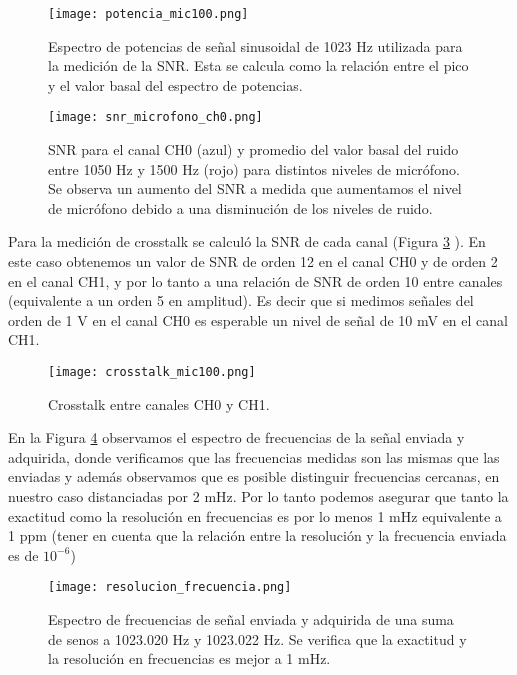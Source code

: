 \documentclass[a4paper, 11pt]{article}
\begin{document}
\begin{figure} [H]
\centering
\texttt{[image: potencia\_mic100.png]}
\caption{Espectro de potencias de señal sinusoidal de 1023 Hz utilizada para la medición de la SNR. Esta se calcula como la relación entre el pico y el valor basal del espectro de potencias. \label{fig:potencia_mic100}}
\end{figure} 

\begin{figure} [H]
\centering
\texttt{[image: snr\_microfono\_ch0.png]}
\caption{SNR para el canal CH0 (azul) y promedio del valor basal del ruido entre 1050 Hz y 1500 Hz (rojo) para distintos niveles de micrófono. Se observa un aumento del SNR a medida que aumentamos el nivel de micrófono debido a una disminución de los niveles de ruido. \label{fig:snr}}
\end{figure} 
Para la medición de crosstalk se calculó la SNR de cada canal %
(Figura \ref{fig:crosstalk_mic100} ). En este caso obtenemos un valor de SNR de orden 12 en el canal CH0 y de orden 2 en el canal CH1,  y por lo tanto a una relación de SNR de orden 10 entre canales (equivalente a un orden 5 en amplitud).  Es decir que si medimos señales del orden de 1 V en el canal CH0 es esperable un nivel de señal de 10 mV en el canal CH1.

\begin{figure} [H]
\centering
\texttt{[image: crosstalk\_mic100.png]}
\caption{Crosstalk entre canales CH0 y CH1. \label{fig:crosstalk_mic100}}
\end{figure} 
 En la Figura  \ref{fig:resolucion_frecuencia} observamos el espectro de frecuencias de la señal enviada y adquirida, donde verificamos que las frecuencias medidas son las mismas que las enviadas y además observamos que es posible distinguir frecuencias cercanas, en nuestro caso distanciadas por 2 mHz. Por lo tanto podemos asegurar que tanto la exactitud como la resolución en frecuencias es por lo menos 1 mHz equivalente a 1 ppm (tener en cuenta que la relación entre la resolución y la frecuencia enviada es de $10^{-6}$)

\begin{figure} [H]
\centering
\texttt{[image: resolucion\_frecuencia.png]}
\caption{Espectro de frecuencias de señal enviada y adquirida de una suma de senos a 1023.020 Hz y 1023.022 Hz. Se verifica que la exactitud y la resolución en frecuencias es mejor a 1 mHz.\label{fig:resolucion_frecuencia}}
\end{figure} 
\end{document}
